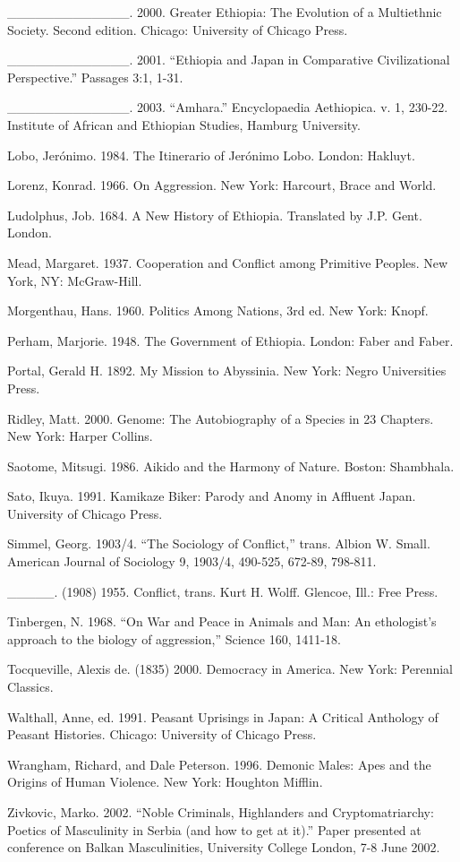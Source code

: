 \begin{list}{}{}
\item \_\_\_\_\_\_\_\_\_\_\_\_\_. 2000. Greater Ethiopia: The Evolution of a Multiethnic Society. Second edition. Chicago: University of Chicago Press.
\item \_\_\_\_\_\_\_\_\_\_\_\_\_. 2001. ``Ethiopia and Japan in Comparative Civilizational Perspective.'' Passages 3:1, 1-31. 
\item \_\_\_\_\_\_\_\_\_\_\_\_\_. 2003. ``Amhara.'' Encyclopaedia Aethiopica. v. 1, 230-22. Institute of African and Ethiopian Studies, Hamburg University.
\item Lobo, Jer\'{o}nimo. 1984. The Itinerario of Jer\'{o}nimo Lobo. London: Hakluyt. 
\item Lorenz, Konrad. 1966. On Aggression. New York: Harcourt, Brace and World.
\item Ludolphus, Job. 1684. A New History of Ethiopia. Translated by J.P. Gent. London.
\item Mead, Margaret. 1937. Cooperation and Conflict among Primitive Peoples. New York, NY: McGraw-Hill.
\item Morgenthau, Hans. 1960. Politics Among Nations, 3rd ed. New York: Knopf.
\item Perham, Marjorie. 1948. The Government of Ethiopia. London: Faber and Faber.
\item Portal, Gerald H. 1892. My Mission to Abyssinia. New York: Negro Universities Press.
\item Ridley, Matt. 2000. Genome: The Autobiography of a Species in 23 Chapters. New York: Harper Collins.
\item Saotome, Mitsugi. 1986. Aikido and the Harmony of Nature. Boston: Shambhala. 
\item Sato, Ikuya. 1991. Kamikaze Biker: Parody and Anomy in Affluent Japan. University of Chicago Press. 
\item Simmel, Georg. 1903/4. ``The Sociology of Conflict,'' trans. Albion W. Small. American Journal of Sociology 9, 1903/4, 490-525, 672-89, 798-811.
\item \_\_\_\_\_. (1908) 1955. Conflict, trans. Kurt H. Wolff. Glencoe, Ill.: Free Press.
\item Tinbergen, N. 1968. ``On War and Peace in Animals and Man: An ethologist's approach to the biology of aggression,'' Science 160, 1411-18.
\item Tocqueville, Alexis de. (1835) 2000. Democracy in America. New York: Perennial Classics.
\item Walthall, Anne, ed. 1991. Peasant Uprisings in Japan: A Critical Anthology of Peasant Histories. Chicago: University of Chicago Press. 
\item Wrangham, Richard, and Dale Peterson. 1996. Demonic Males: Apes and the Origins of Human Violence. New York: Houghton Mifflin.
\item Zivkovic, Marko. 2002. ``Noble Criminals, Highlanders and Cryptomatriarchy: Poetics of Masculinity in Serbia (and how to get at it).'' Paper presented at conference on Balkan Masculinities, University College London, 7-8 June 2002.
\end{list}